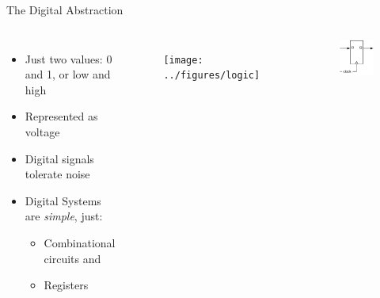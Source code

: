 \begin{frame}[fragile]{The Digital Abstraction}
\begin{columns}
 
\begin{itemize}
\item Just two values: 0 and 1, or low and high
\item Represented as voltage
\item Digital signals tolerate noise
\item Digital Systems are \emph{simple}, just:
\begin{itemize}
\item Combinational circuits and
\item Registers
\end{itemize}
\end{itemize}
 
\begin{figure}
  \texttt{[image: ../figures/logic]}
\end{figure}
\begin{figure}
  \includegraphics[scale=\scale]{../figures/register}
\end{figure}
\end{columns}

\end{frame}

